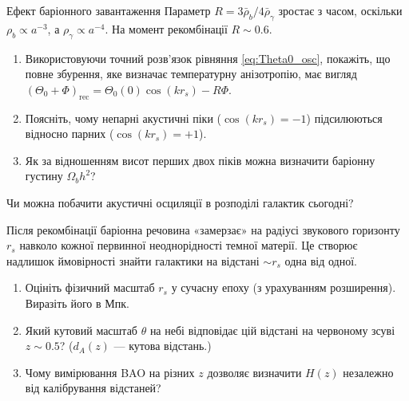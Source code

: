 \begin{problem}{Ефект баріонного завантаження}
Параметр $R = 3\bar\rho_b/4\bar\rho_\gamma$ зростає з часом, оскільки $\rho_b \propto a^{-3}$,
а $\rho_\gamma \propto a^{-4}$. На момент рекомбінації $R \sim 0.6$.

\begin{enumerate}
    \item Використовуючи точний розв'язок рівняння \eqref{eq:Theta0_osc},
          покажіть, що повне збурення, яке визначає температурну анізотропію,
          має вигляд $(\Theta_0 + \Phi)_{\text{rec}} = \Theta_0(0)\cos(k r_s) - R\Phi$.
    \item Поясніть, чому непарні акустичні піки ($\cos(k r_s) = -1$)
          підсилюються відносно парних ($\cos(k r_s) = +1$).
    \item Як за відношенням висот перших двох піків можна визначити
          баріонну густину $\Omega_b h^2$?
\end{enumerate}
\end{problem}


\begin{problem}{Чи можна побачити акустичні осциляції в розподілі галактик сьогодні?}

Після рекомбінації баріонна речовина «замерзає» на радіусі звукового
горизонту $r_s$ навколо кожної первинної неоднорідності темної матерії.
Це створює надлишок ймовірності знайти галактики на відстані $\sim r_s$
одна від одної.

\begin{enumerate}
    \item Оцініть фізичний масштаб $r_s$ у сучасну епоху (з урахуванням розширення).
          Виразіть його в Мпк.
    \item Який кутовий масштаб $\theta$ на небі відповідає цій відстані
          на червоному зсуві $z \sim 0.5$? ($d_A(z)$ — кутова відстань.)
    \item Чому вимірювання BAO на різних $z$ дозволяє визначити $H(z)$
          незалежно від калібрування відстаней?
\end{enumerate}
\end{problem}